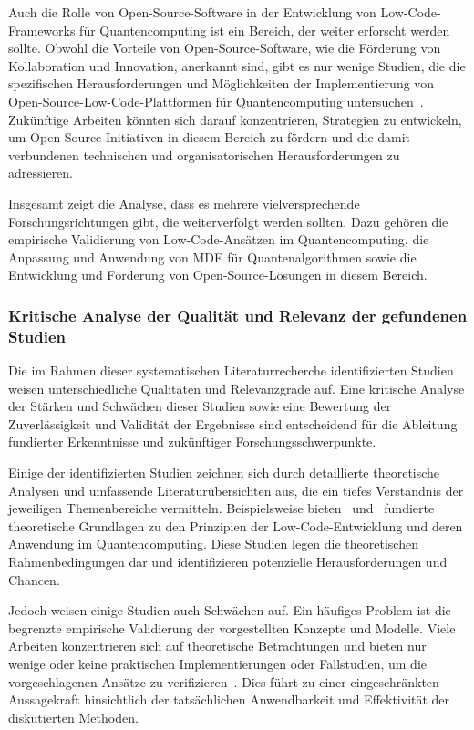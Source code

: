 Auch die Rolle von Open-Source-Software in der Entwicklung von Low-Code-Frameworks für Quantencomputing ist ein Bereich, 
der weiter erforscht werden sollte. Obwohl die Vorteile von Open-Source-Software, wie die Förderung von Kollaboration und 
Innovation, anerkannt sind, gibt es nur wenige Studien, die die spezifischen Herausforderungen und Möglichkeiten der 
Implementierung von Open-Source-Low-Code-Plattformen für Quantencomputing untersuchen~\cite{Amato_2023, Ahmad_2023}. 
Zukünftige Arbeiten könnten sich darauf konzentrieren, Strategien zu entwickeln, um Open-Source-Initiativen in diesem 
Bereich zu fördern und die damit verbundenen technischen und organisatorischen Herausforderungen zu adressieren.

Insgesamt zeigt die Analyse, dass es mehrere vielversprechende Forschungsrichtungen gibt, die weiterverfolgt werden sollten. 
Dazu gehören die empirische Validierung von Low-Code-Ansätzen im Quantencomputing, die Anpassung und Anwendung von MDE für 
Quantenalgorithmen sowie die Entwicklung und Förderung von Open-Source-Lösungen in diesem Bereich. 

\subsubsection{Kritische Analyse der Qualität und Relevanz der gefundenen Studien}

Die im Rahmen dieser systematischen Literaturrecherche identifizierten Studien weisen unterschiedliche 
Qualitäten und Relevanzgrade auf. Eine kritische Analyse der Stärken und Schwächen dieser Studien sowie eine Bewertung 
der Zuverlässigkeit und Validität der Ergebnisse sind entscheidend für die Ableitung fundierter Erkenntnisse und zukünftiger Forschungsschwerpunkte.

Einige der identifizierten Studien zeichnen sich durch detaillierte theoretische Analysen und umfassende 
Literaturübersichten aus, die ein tiefes Verständnis der jeweiligen Themenbereiche vermitteln. 
Beispielsweise bieten~\cite{Perez-Delgado_2020} und~\cite{Gemeinhardt_2021} fundierte theoretische Grundlagen 
zu den Prinzipien der Low-Code-Entwicklung und deren Anwendung im Quantencomputing. Diese Studien legen die 
theoretischen Rahmenbedingungen dar und identifizieren potenzielle Herausforderungen und Chancen.

Jedoch weisen einige Studien auch Schwächen auf. Ein häufiges Problem ist die begrenzte empirische Validierung 
der vorgestellten Konzepte und Modelle. Viele Arbeiten konzentrieren sich auf theoretische Betrachtungen und 
bieten nur wenige oder keine praktischen Implementierungen oder Fallstudien, um die vorgeschlagenen Ansätze 
zu verifizieren~\cite{Amato_2023}. Dies führt zu einer eingeschränkten Aussagekraft hinsichtlich der tatsächlichen 
Anwendbarkeit und Effektivität der diskutierten Methoden.

